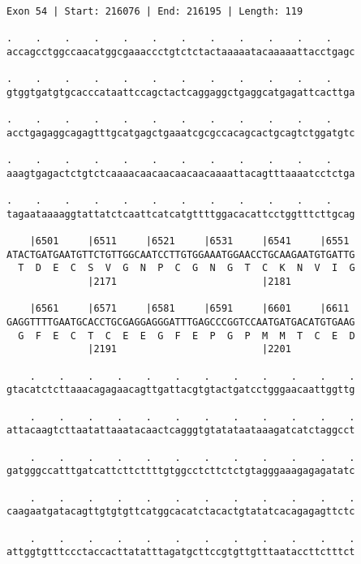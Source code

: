 \documentclass{article}
\begin{document}
\begin{Verbatim}[fontfamily=courier]
Exon 54 | Start: 216076 | End: 216195 | Length: 119

.    .    .    .    .    .    .    .    .    .    .    .    
accagcctggccaacatggcgaaaccctgtctctactaaaaatacaaaaattacctgagc

.    .    .    .    .    .    .    .    .    .    .    .    
gtggtgatgtgcacccataattccagctactcaggaggctgaggcatgagattcacttga

.    .    .    .    .    .    .    .    .    .    .    .    
acctgagaggcagagtttgcatgagctgaaatcgcgccacagcactgcagtctggatgtc

.    .    .    .    .    .    .    .    .    .    .    .    
aaagtgagactctgtctcaaaacaacaacaacaacaaaattacagtttaaaatcctctga

.    .    .    .    .    .    .    .    .    .    .    .    
tagaataaaaggtattatctcaattcatcatgttttggacacattcctggtttcttgcag

    |6501     |6511     |6521     |6531     |6541     |6551 
ATACTGATGAATGTTCTGTTGGCAATCCTTGTGGAAATGGAACCTGCAAGAATGTGATTG
  T  D  E  C  S  V  G  N  P  C  G  N  G  T  C  K  N  V  I  G
              |2171                         |2181           

    |6561     |6571     |6581     |6591     |6601     |6611 
GAGGTTTTGAATGCACCTGCGAGGAGGGATTTGAGCCCGGTCCAATGATGACATGTGAAG
  G  F  E  C  T  C  E  E  G  F  E  P  G  P  M  M  T  C  E  D
              |2191                         |2201           

    .    .    .    .    .    .    .    .    .    .    .    .
gtacatctcttaaacagagaacagttgattacgtgtactgatcctgggaacaattggttg

    .    .    .    .    .    .    .    .    .    .    .    .
attacaagtcttaatattaaatacaactcagggtgtatataataaagatcatctaggcct

    .    .    .    .    .    .    .    .    .    .    .    .
gatgggccatttgatcattcttcttttgtggcctcttctctgtagggaaagagagatatc

    .    .    .    .    .    .    .    .    .    .    .    .
caagaatgatacagttgtgtgttcatggcacatctacactgtatatcacagagagttctc

    .    .    .    .    .    .    .    .    .    .    .    .
attggtgtttccctaccacttatatttagatgcttccgtgttgtttaataccttctttct
\end{Verbatim}
\newpage
\end{document}
